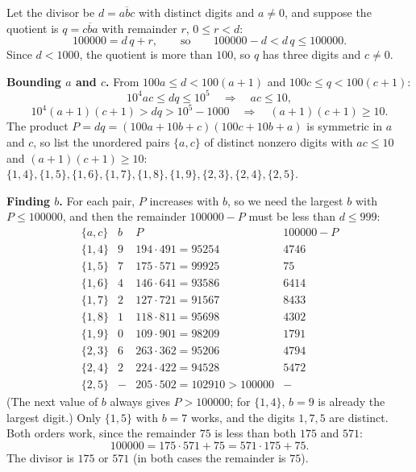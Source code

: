 Let the divisor be $d=\overline{abc}$ with distinct digits and $a\ne0$, and suppose the quotient is $q=\overline{cba}$ with remainder $r$, $0\le r<d$:
\[
100000=d\,q+r,\qquad\text{so}\qquad 100000-d<d\,q\le100000 .
\]
Since $d<1000$, the quotient is more than $100$, so $q$ has three digits and $c\ne0$.

\textbf{Bounding $a$ and $c$.} From $100a\le d<100(a+1)$ and $100c\le q<100(c+1)$:
\[
10^4ac\le dq\le10^5\quad\Rightarrow\quad ac\le10,
\]
\[
10^4(a+1)(c+1)>dq>10^5-1000\quad\Rightarrow\quad(a+1)(c+1)\ge10 .
\]
The product $P=dq=(100a+10b+c)(100c+10b+a)$ is symmetric in $a$ and $c$, so list the unordered pairs $\{a,c\}$ of distinct nonzero digits with $ac\le10$ and $(a+1)(c+1)\ge10$: $\{1,4\},\{1,5\},\{1,6\},\{1,7\},\{1,8\},\{1,9\},\{2,3\},\{2,4\},\{2,5\}$.

\textbf{Finding $b$.} For each pair, $P$ increases with $b$, so we need the largest $b$ with $P\le100000$, and then the remainder $100000-P$ must be less than $d\le999$:
\[
\begin{array}{c|c|c|c}
\{a,c\} & b & P & 100000-P\\ \hline
\{1,4\} & 9 & 194\cdot491=95254 & 4746\\
\{1,5\} & 7 & 175\cdot571=99925 & 75\\
\{1,6\} & 4 & 146\cdot641=93586 & 6414\\
\{1,7\} & 2 & 127\cdot721=91567 & 8433\\
\{1,8\} & 1 & 118\cdot811=95698 & 4302\\
\{1,9\} & 0 & 109\cdot901=98209 & 1791\\
\{2,3\} & 6 & 263\cdot362=95206 & 4794\\
\{2,4\} & 2 & 224\cdot422=94528 & 5472\\
\{2,5\} & - & 205\cdot502=102910>100000 & -
\end{array}
\]
(The next value of $b$ always gives $P>100000$; for $\{1,4\}$, $b=9$ is already the largest digit.) Only $\{1,5\}$ with $b=7$ works, and the digits $1,7,5$ are distinct. Both orders work, since the remainder $75$ is less than both $175$ and $571$:
\[
100000=175\cdot571+75=571\cdot175+75 .
\]
The divisor is $\boxed{175\text{ or }571}$ (in both cases the remainder is $75$).
